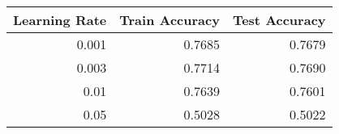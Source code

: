 \begin{tabular}{|r||r|r|}
\hline
Learning Rate & Train Accuracy & Test Accuracy \\
\hline
0.001 & 0.7685 & 0.7679 \\
0.003 & 0.7714 & 0.7690 \\
0.01 & 0.7639 & 0.7601 \\
0.05 & 0.5028 & 0.5022 \\
\hline
\end{tabular}
